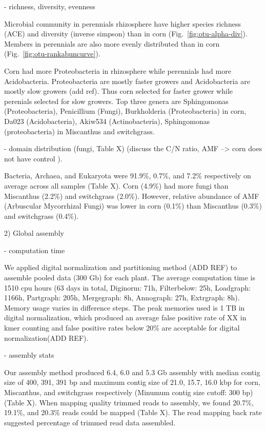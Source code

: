 \documentclass[12pt]{article}
\begin{document}
- richness, diversity, evenness

Microbial community in perennials rhizosphere have higher species richness (ACE) and diversity (inverse simpson) than in corn (Fig.~\ref{fig:otu-alpha-div}). Members in perennials are also more evenly distributed than in corn (Fig.~\ref{fig:otu-rankabuncurve}).

Corn had more Proteobacteria in rhizosphere while perennials had more Acidobacteria. Proteobacteria are mostly faster growers and Acidobacteria are mostly slow growers (add ref). Thus corn selected for faster grower while perenials selected for slow growers. Top three genera are Sphingomonas (Proteobacteria), Penicillium (Fungi), Burkholderia (Proteobacteria) in corn, Da023 (Acidobacteria), Akiw534 (Actinobacteria), Sphingomonas (proteobacteria) in Miscanthus and switchgrass.

- domain distribution (fungi, Table X) (discuss the C/N ratio, AMF --> corn does not have control ).

Bacteria, Archaea, and Eukaryota were 91.9\%, 0.7\%, and 7.2\% respectively on average across all samples (Table X). Corn (4.9\%) had more fungi than Miscanthus (2.2\%) and switchgrass (2.0\%). However, relative abundance of AMF (Arbuscular Mycorrhizal Fungi) was lower in corn (0.1\%) than Miscanthus (0.3\%) and switchgrass (0.4\%).
  
2) Global assembly

- computation time

We applied digital normalization and partitioning method (ADD REF) to assemble pooled data (300 Gb) for each plant. The average computation time is 1510 cpu hours (63 days in total, Diginorm: 71h, Filterbelow: 25h, Loadgraph: 1166h, Partgraph: 205h, Mergegraph: 8h, Annograph: 27h, Extrgraph: 8h). Memory usage varies in difference steps. The peak memories used is 1 TB in digital normalization, which produced an average false positive rate of XX in kmer counting and false positive rates below 20\% are acceptable for digital normalization(ADD REF). 

- assembly stats

Our assembly method produced  6.4, 6.0 and 5.3 Gb assembly with median contig size of 400, 391, 391 bp and maximum contig size of 21.0, 15.7, 16.0 kbp for corn, Miscanthus, and switchgrass respectively (Minumum contig size cutoff: 300 bp)(Table X). When mapping quality trimmed reads to assembly, we found 20.7\%, 19.1\%, and 20.3\% reads could be mapped (Table X). The read mapping back rate suggested percentage of trimmed read data assembled.
\end{document}

